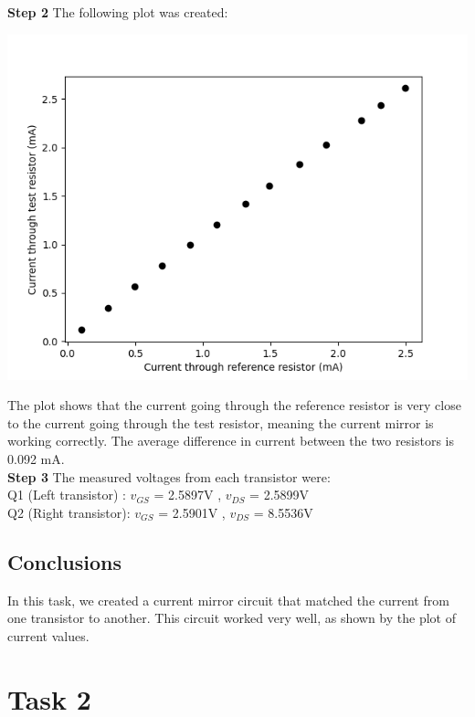 \documentclass[notitlepage, 12pt]{report}  %
\begin{document}
\textbf{Step 2}
The following plot was created:

\begin{center}
    \includegraphics[scale=0.6]{current_plot.png}
\end{center}

The plot shows that the current going through the reference resistor is very close to the current going through the test resistor, meaning 
the current mirror is working correctly. The average difference in current between the two resistors is 0.092 mA. \\

\textbf{Step 3}
The measured voltages from each transistor were: \\

Q1 (Left transistor) : $v_{GS}$ = 2.5897V , $v_{DS}$ = 2.5899V \\

Q2 (Right transistor): $v_{GS}$ = 2.5901V , $v_{DS}$ = 8.5536V \\

\subsection*{Conclusions}

\indent\indent In this task, we created a current mirror circuit that matched the current from one transistor to another. 
This circuit worked very well, as shown by the plot of current values.

\newpage

\section*{Task 2}
\end{document}
